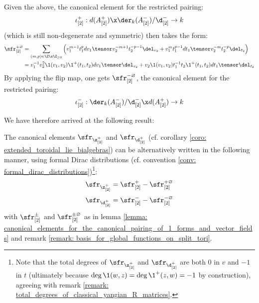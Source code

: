 \begin{remark}
            Given the above, the canonical element for the restricted pairing:
                $$\iota_{[2]}^+: d(A_{[2]}^+) \x \der_k( A_{[2]}^- )/\d_{[2]}^- \to k$$
            (which is still non-degenerate and symmetric) then takes the form:
                $$
                    \begin{aligned}
                        \sfr_{[2]}^{+ \varnothing} & = \sum_{(m, p) \in \Z \x \Z_{\geq 0}} \left( v_1^{m - 1} t_1^p dv_1 \tensor v_2^{-m + 1} t_2^{-p - 1} \del_{v_2} + v_1^m t_1^{p - 1} dt_1 \tensor v_2^{-m} t_2^{-p} \del_{t_2} \right)
                        \\
                        & = v_1^{-1} v_2^2 \1(v_1, v_2) \1^+(t_1, t_2) dv_1 \tensor \del_{v_2} + v_2 \1(v_1, v_2) t_1^{-1} t_2 \1^+(t_1, t_2) dt_1 \tensor \del_{t_2}
                    \end{aligned}
                $$
            By applying the flip map, one gets $\sfr_{[2]}^{- \varnothing}$, the canonical element for the restricted pairing:
                $$\iota_{[2]}^-: \der_k( A_{[2]}^- )/\d_{[2]}^- \x d(A_{[2]}^+) \to k$$
        \end{remark}
        We have therefore arrived at the following result:
        \begin{proposition} \label{prop: toroidal_classical_R_matrices_in_terms_of_formal_distributions}
            The canonical elements $\sfr_{\z_{[2]}^+}$ and $\sfr_{\d_{[2]}^+}$ (cf. corollary \ref{coro: extended_toroidal_lie_bialgebras}) can be alternatively written in the following manner, using formal Dirac distributions (cf. convention \ref{conv: formal_dirac_distributions})\footnote{Note that the total degrees of $\sfr_{\z_{[2]}^+}$ and $\sfr_{\d_{[2]}^+}$ are both $0$ in $v$ and $-1$ in $t$ (ultimately because $\deg \1(w, z) = \deg \1^+(z, w) = -1$ by construction), agreeing with remark \ref{remark: total_degrees_of_classical_yangian_R_matrices}.}:
                $$\sfr_{\z_{[2]}^+} = \sfr_{[2]}^+ - \sfr_{[2]}^{+ \varnothing}$$
                $$\sfr_{\d_{[2]}^+} = \sfr_{[2]}^- - \sfr_{[2]}^{- \varnothing}$$
            with $\sfr_{[2]}^{\pm}$ and $\sfr_{[2]}^{\pm \varnothing}$ as in lemma \ref{lemma: canonical_elements_for_the_canonical_pairing_of_1_forms_and_vector_fields} and remark \ref{remark: basis_for_global_functions_on_split_tori}. 
        \end{proposition}
        
